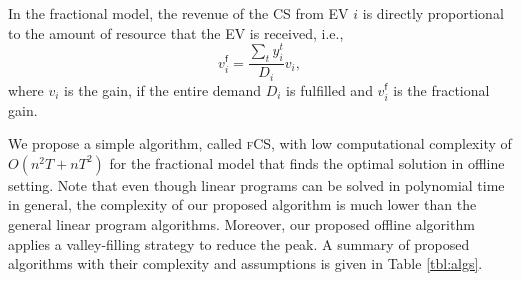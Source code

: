 \documentclass[journal]{IEEEtran}
\newcommand{\rev}[1]{{\color{black}#1}}%
\newcommand{\rev}[1]{#1}
\newcommand{\fcs}{\textsc{fCS}\xspace}
\newcommand{\MCSP}{\textsf{SPAN}\xspace}
\newcommand{\focs}{\textsc{foCS}\xspace}
\begin{document}

In the fractional model, the revenue of the CS from EV $i$ is directly proportional to the amount of resource that the EV is received, i.e.,
		\begin{equation}
			v_i^{\mathsf{f}}=\frac{\sum_t y_i^t}{D_i}v_i,
			\label{Eq:partial_value}
		\end{equation}
		where $v_i$ is the gain, if the entire demand $D_i$ is fulfilled and $v_i^{\mathsf{f}}$ is the fractional gain.  

We propose a simple algorithm, called \fcs, with low computational complexity \rev{ of $O(n^2T+nT^2)$} for the fractional model that finds the optimal solution in offline setting. Note that even though linear programs can be solved in polynomial time in general, the complexity of our proposed algorithm is much lower than the general linear program algorithms. Moreover, our proposed offline algorithm applies a valley-filling strategy to reduce the peak. 
A summary of proposed algorithms with their complexity and assumptions is given in Table \ref{tbl:algs}.		
\end{document}
